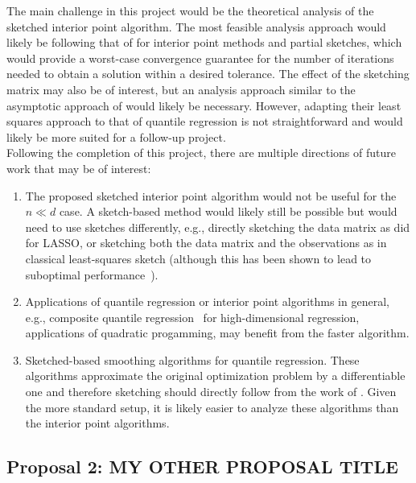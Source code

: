 The main challenge in this project would be the theoretical analysis of the sketched interior point algorithm. The most feasible analysis approach would likely be following that of \citet{Pilanci:2017} for interior point methods and partial sketches, which would provide a worst-case convergence guarantee for the number of iterations needed to obtain a solution within a desired tolerance. The effect of the sketching matrix may also be of interest, but an analysis approach similar to the asymptotic approach of \citet{Lacotte:2020} would likely be necessary. However, adapting their least squares approach to that of quantile regression is not straightforward and would likely be more suited for a follow-up project.
\\

Following the completion of this project, there are multiple directions of future work that may be of interest:
\begin{enumerate}
\item
The proposed sketched interior point algorithm would not be useful for the $n\ll d$ case. A sketch-based method would likely still be possible but would need to use sketches differently, e.g., directly sketching the data matrix as \citet{Pham:2015} did for LASSO, or sketching both the data matrix and the observations as in classical least-squares sketch (although this has been shown to lead to suboptimal performance~\citep{Pilanci:2016}).
\item
Applications of quantile regression or interior point algorithms in general, e.g., composite quantile regression~\citep{Zou:2008} for high-dimensional regression, applications of quadratic progamming, may benefit from the faster algorithm.
\item
Sketched-based smoothing algorithms for quantile regression. These algorithms approximate the original optimization problem by a differentiable one and therefore sketching should directly follow from the work of \citet{Pilanci:2017}. Given the more standard setup, it is likely easier to analyze these algorithms than the interior point algorithms.
\end{enumerate}


\newpage


\subsection{Proposal 2: MY OTHER PROPOSAL TITLE} %

